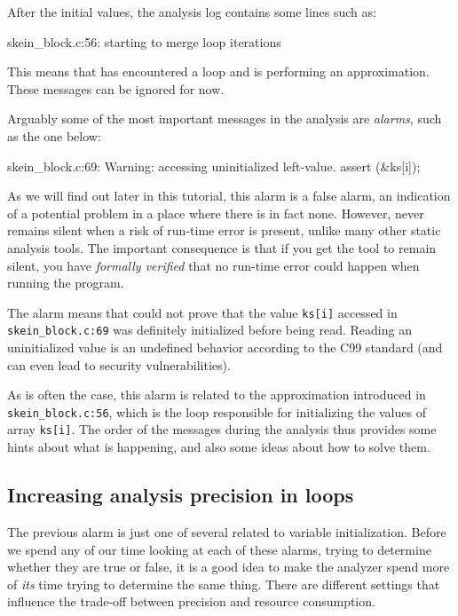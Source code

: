 \documentclass{frama-c-book}
\newcommand{\isoc}{\textsf{C99}}
\begin{document}
After the initial values, the analysis log contains some lines such as:

\begin{logs}
[eva] skein_block.c:56: starting to merge loop iterations
\end{logs}

This means that \Eva{} has encountered a loop and is performing an
approximation. These messages can be ignored for now.

Arguably some of the most important messages in the analysis are {\em alarms},
such as the one below:

\begin{logs}
 skein_block.c:69: Warning:
  accessing uninitialized left-value. assert \initialized(&ks[i]);
\end{logs}

As we will find out later in this tutorial, this alarm is a false
alarm, an indication of a potential problem in a place where there is
in fact none. However, \Eva{} never remains
silent when a risk of run-time error is present, unlike many other
static analysis tools. The important consequence is that if you get
the tool to remain silent, you have {\em formally verified} that
no run-time error could happen when running the program.

The alarm means that \Eva{} could not prove that the value \verb|ks[i]|
accessed in \verb|skein_block.c:69| was definitely initialized before being
read. Reading an uninitialized value is an undefined behavior according to the
\isoc{} standard (and can even lead to security vulnerabilities).

As is often the case, this alarm is related to the approximation introduced
in \verb|skein_block.c:56|, which is the loop responsible for initializing
the values of array \verb|ks[i]|. The order of the messages during the
analysis thus provides some hints about what is happening, and also some
ideas about how to solve them.

\subsection{Increasing analysis precision in loops}

The previous alarm is just one of several related to variable initialization.
Before we spend any of our time looking at each of these alarms,
trying to determine whether they are true or false,
it is a good idea to make the analyzer spend more of {\em its} time
trying to determine the same thing.
There are different settings that influence the trade-off
between precision and resource consumption.
\end{document}
